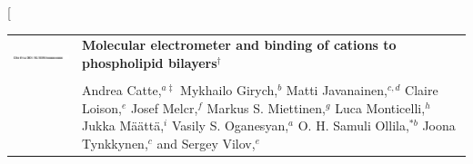 \documentclass[twoside,twocolumn,9pt]{article}
\begin{document}
\twocolumn[
  \begin{@twocolumnfalse}
\vspace{3cm}
\sffamily
\begin{tabular}{m{4.5cm} p{13.5cm} }

\includegraphics{head_foot/DOI} & \noindent\LARGE{\textbf{Molecular electrometer and binding of cations to phospholipid bilayers$^\dag$}} \\%
\vspace{0.3cm} & \vspace{0.3cm} \\

 & \noindent\large{Andrea Catte,\textit{$^{a\ddag}$} Mykhailo Girych,\textit{$^{b}$} Matti Javanainen,\textit{$^{c,d}$} Claire Loison,\textit{$^{e}$} Josef Melcr,\textit{$^{f}$} Markus S. Miettinen,\textit{$^{g}$} Luca Monticelli,\textit{$^{h}$} Jukka M{\"a}{\"a}tt{\"a},\textit{$^{i}$} Vasily S. Oganesyan,\textit{$^{a}$} O. H. Samuli Ollila,\textit{$^{\ast b}$} Joona Tynkkynen,\textit{$^{c}$} and Sergey Vilov,\textit{$^{e}$}
} \\%


\end{tabular}
\end{@twocolumnfalse}
\end{document}
